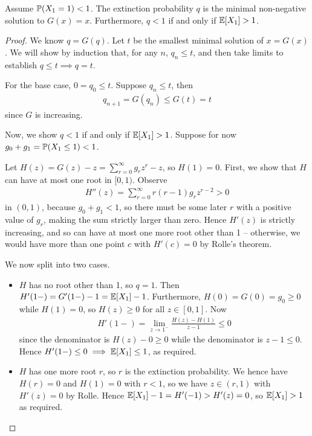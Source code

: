\documentclass{../../template/note}
\begin{document}
    \begin{proposition}
        Assume \(\mathbb P(X_1 = 1) < 1\). The extinction probability \(q\) is the minimal non-negative solution to \(G(x) = x\). Furthermore, \(q < 1\) if and only if \(\mathbb E[X_1] > 1\).
    \end{proposition}
    
    \begin{proof}
        We know \(q = G(q)\). Let \(t\) be the smallest minimal solution of \(x=G(x)\). We will show by induction that, for any \(n\), \(q_n \leq t\), and then take limits to establish \(q \leq t \implies q = t\).

        For the base case, \(0 = q_0 \leq t\). Suppose \(q_n \leq t\), then
        \begin{align*}
            q_{n+1} = G(q_n) \leq G(t) = t
        \end{align*}
        since \(G\) is increasing.      
        
        Now, we show \(q < 1\) if and only if \(\mathbb E[X_1] > 1\). Suppose for now \(g_0 + g_1 = \mathbb P(X_1 \leq 1) < 1\).

        Let \(H(z) = G(z) - z = \sum_{r=0}^\infty g_rz^r - z\), so \(H(1) = 0\). First, we show that \(H\) can have at most one root in \([0, 1)\). Observe
        \begin{align*}
            H''(z) = \sum_{r=0}^\infty r(r-1)g_rz^{r-2} > 0
        \end{align*}
        in \((0, 1)\), because \(g_0 + g_1 < 1\), so there must be some later \(r\) with a positive value of \(g_r\), making the sum strictly larger than zero. Hence \(H'(z)\) is strictly increasing, and so can have at most one more root other than 1 -- otherwise, we would have more than one point \(c\) with \(H'(c) = 0\) by Rolle's theorem.

        We now split into two cases.
        \begin{itemize}
            \item \(H\) has no root other than 1, so \(q=1\). Then \(H'(1-) = G'(1-) - 1 = \mathbb E[X_1] - 1\). Furthermore, \(H(0) = G(0) = g_0 \geq 0\) while \(H(1) = 0\), so \(H(z) \geq 0\) for all \(z \in [0, 1]\). Now
            \begin{align*}
                H'(1-) = \lim_{z \to 1^-} \frac{H(z)-H(1)}{z-1} \leq 0
            \end{align*}
            since the denominator is \(H(z) - 0 \geq 0\) while the denominator is \(z-1 \leq 0\). Hence \(H'(1-) \leq 0 \implies \mathbb E[X_1] \leq 1\), as required.
            \item \(H\) has one more root \(r\), so \(r\) is the extinction probability. We hence have \(H(r) = 0\) and \(H(1) = 0\) with \(r<1\), so we have \(z \in (r, 1)\) with \(H'(z) = 0\) by Rolle. Hence \(\mathbb E[X_1] - 1 = H'(-1) > H'(z) = 0\), so \(\mathbb E[X_1] > 1\) as required. 
        \end{itemize}


\end{proof}
\end{document}
